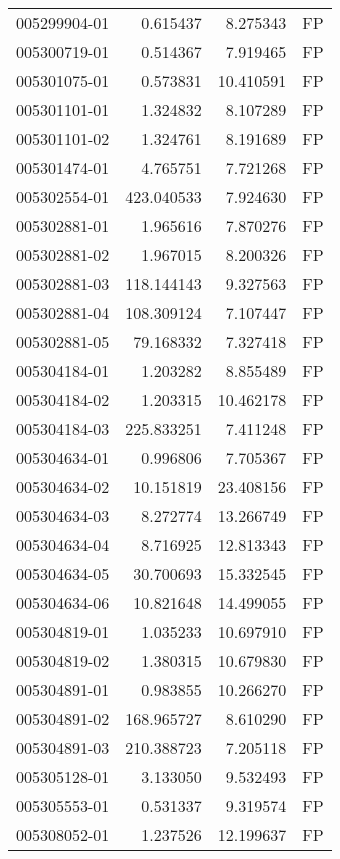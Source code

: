 \begin{tabular}{lrrl}
005299904-01 &    0.615437 &     8.275343 &   FP \\
005300719-01 &    0.514367 &     7.919465 &   FP \\
005301075-01 &    0.573831 &    10.410591 &   FP \\
005301101-01 &    1.324832 &     8.107289 &   FP \\
005301101-02 &    1.324761 &     8.191689 &   FP \\
005301474-01 &    4.765751 &     7.721268 &   FP \\
005302554-01 &  423.040533 &     7.924630 &   FP \\
005302881-01 &    1.965616 &     7.870276 &   FP \\
005302881-02 &    1.967015 &     8.200326 &   FP \\
005302881-03 &  118.144143 &     9.327563 &   FP \\
005302881-04 &  108.309124 &     7.107447 &   FP \\
005302881-05 &   79.168332 &     7.327418 &   FP \\
005304184-01 &    1.203282 &     8.855489 &   FP \\
005304184-02 &    1.203315 &    10.462178 &   FP \\
005304184-03 &  225.833251 &     7.411248 &   FP \\
005304634-01 &    0.996806 &     7.705367 &   FP \\
005304634-02 &   10.151819 &    23.408156 &   FP \\
005304634-03 &    8.272774 &    13.266749 &   FP \\
005304634-04 &    8.716925 &    12.813343 &   FP \\
005304634-05 &   30.700693 &    15.332545 &   FP \\
005304634-06 &   10.821648 &    14.499055 &   FP \\
005304819-01 &    1.035233 &    10.697910 &   FP \\
005304819-02 &    1.380315 &    10.679830 &   FP \\
005304891-01 &    0.983855 &    10.266270 &   FP \\
005304891-02 &  168.965727 &     8.610290 &   FP \\
005304891-03 &  210.388723 &     7.205118 &   FP \\
005305128-01 &    3.133050 &     9.532493 &   FP \\
005305553-01 &    0.531337 &     9.319574 &   FP \\
005308052-01 &    1.237526 &    12.199637 &   FP \\

\end{tabular}

